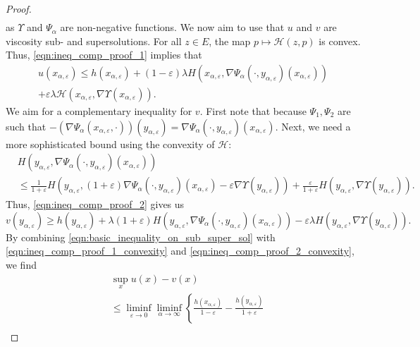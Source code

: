 \documentclass[a4paper]{article}
\newcommand{\cH}{\mathcal{H}}
\numberwithin{equation}{section}
\theoremstyle{definition}
\begin{document}
\begin{proof}
\begin{align}
	\end{align}
	as $\Upsilon$ and $\Psi_\alpha$ are non-negative functions. We now aim to use that $u$ and $v$ are viscosity sub- and supersolutions. For all $z \in E$, the map $p \mapsto \cH(z,p)$ is convex. Thus, \eqref{eqn:ineq_comp_proof_1} implies that
	\begin{multline} \label{eqn:ineq_comp_proof_1_convexity}
		u(x_{\alpha,\varepsilon}) \leq h(x_{\alpha,\varepsilon}) + (1-\varepsilon) \lambda H(x_{\alpha,\varepsilon}, \nabla \Psi_\alpha(\cdot,y_{\alpha,\varepsilon})(x_{\alpha,\varepsilon}))  \\
		+ \varepsilon \lambda \cH(x_{\alpha,\varepsilon},\nabla \Upsilon(x_{\alpha,\varepsilon})).
	\end{multline}
	We aim for a complementary inequality for $v$. First note that because $\Psi_1,\Psi_2$ are such that $- ( \nabla \Psi_\alpha(x_{\alpha,\varepsilon},\cdot))(y_{\alpha,\varepsilon}) = \nabla \Psi_\alpha(\cdot, y_{\alpha,\varepsilon})(x_{\alpha,\varepsilon})$. Next, we need a more sophisticated bound using the convexity of $\cH$:
	\begin{align*}
		& H(y_{\alpha,\varepsilon}, \nabla \Psi_\alpha(\cdot, y_{\alpha,\varepsilon})(x_{\alpha,\varepsilon})) \\
		& \leq \frac{1}{1+\varepsilon} H(y_{\alpha,\varepsilon},(1+\varepsilon)\nabla \Psi_\alpha(\cdot, y_{\alpha,\varepsilon})(x_{\alpha,\varepsilon}) - \varepsilon \nabla \Upsilon(y_{\alpha,\varepsilon})) + \frac{\varepsilon}{1+\varepsilon} H(y_{\alpha,\varepsilon}, \nabla \Upsilon(y_{\alpha,\varepsilon})).
	\end{align*}
	Thus, \eqref{eqn:ineq_comp_proof_2} gives us
	\begin{equation} \label{eqn:ineq_comp_proof_2_convexity}
		v(y_{\alpha,\varepsilon}) \geq h(y_{\alpha,\varepsilon}) + \lambda (1+\varepsilon) H(y_{\alpha,\varepsilon},\nabla\Psi_\alpha(\cdot,y_{\alpha,\varepsilon})(x_{\alpha,\varepsilon})) - \varepsilon \lambda H(y_{\alpha,\varepsilon},\nabla \Upsilon(y_{\alpha,\varepsilon})).
	\end{equation}
	By combining \eqref{eqn:basic_inequality_on_sub_super_sol} with \eqref{eqn:ineq_comp_proof_1_convexity} and \eqref{eqn:ineq_comp_proof_2_convexity}, we find
	\begin{align*} 
		& \sup_x u(x) - v(x) \nonumber\\
		& \leq \liminf_{\varepsilon \rightarrow 0} \liminf_{\alpha \rightarrow \infty} \left\{ \frac{h(x_{\alpha,\varepsilon})}{1 - \varepsilon} - \frac{h(y_{\alpha,\varepsilon})}{1+\varepsilon} \right.  \\

\end{align*}
\end{proof}
\end{document}
